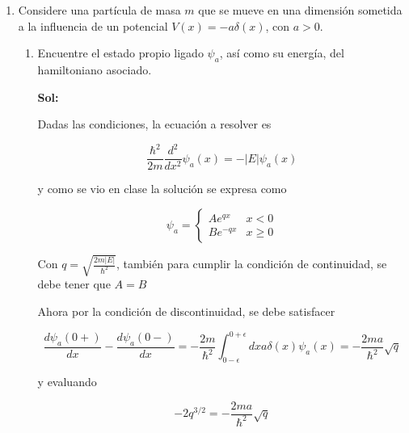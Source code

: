 \documentclass[12pt,a4paper]{article}
\begin{document}
\begin{enumerate}
\begin{enumerate}
    \end{enumerate}
    
    
    
    
    
    
    \item Considere una partícula de masa $m$ que se mueve en una dimensión sometida a la influencia de un potencial $V(x)=-a\delta(x)$, con $a>0$.
    
    \begin{enumerate}
        \item Encuentre el estado propio ligado $\psi_a$, así como su energía, del hamiltoniano asociado.
        
        \textbf{Sol:}
        
        Dadas las condiciones, la ecuación a resolver es
        
        \begin{equation*}
            \frac{\hbar^2}{2m} \frac{d^2}{dx^2} \psi_{a} (x) = -|E| \psi_{a}(x)
        \end{equation*}
        
        y como se vio en clase la solución se expresa como
        
        \begin{equation*}
            \psi_{a} = \left\{\begin{array}{lcc}
             A e^{qx}  & x < 0 \\
              B e^{-qx} & x \geq 0
             \end{array} \right.
        \end{equation*}
        
        Con $q = \sqrt{\frac{2m |E|}{\hbar^2}}$, también para cumplir la condición de continuidad, se debe tener que $A= B$
        
        Ahora  por la condición de discontinuidad, se debe satisfacer
        
        \begin{equation*}
            \frac{d \psi_{a}(0+)}{d x} - \frac{d \psi_{a}(0-)}{dx} = -\frac{2m}{\hbar^2} \int_{0-\epsilon}^{0+\epsilon} dx a \delta (x) \psi_{a} (x) = -\frac{2ma}{\hbar^2} \sqrt{q}
        \end{equation*}
        
        y evaluando
        
        \begin{equation*}
            -2q^{3/2} = - \frac{2ma}{\hbar^2}\sqrt{q}
        \end{equation*}
        

\end{enumerate}
\end{enumerate}
\end{document}
